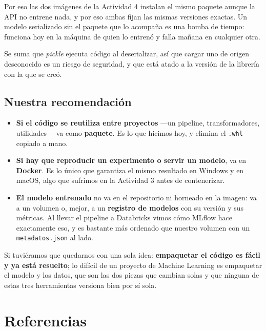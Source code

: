 \documentclass[12pt,a4paper]{article}
\begin{document}
Por eso las dos imágenes de la Actividad 4 instalan el mismo paquete aunque la API no entrene
nada, y por eso ambas fijan las mismas versiones exactas. Un modelo serializado sin el paquete
que lo acompaña es una bomba de tiempo: funciona hoy en la máquina de quien lo entrenó y falla
mañana en cualquier otra.

Se suma que \emph{pickle} ejecuta código al deserializar, así que cargar uno de origen
desconocido es un riesgo de seguridad, y que está atado a la versión de la librería con la que se
creó.

\subsection{Nuestra recomendación}

\begin{itemize}[leftmargin=1.2em]
\item \textbf{Si el código se reutiliza entre proyectos} —un pipeline, transformadores, utilidades—
va como \textbf{paquete}. Es lo que hicimos hoy, y elimina el \texttt{.whl} copiado a mano.
\item \textbf{Si hay que reproducir un experimento o servir un modelo}, va en \textbf{Docker}. Es
lo único que garantiza el mismo resultado en Windows y en macOS, algo que sufrimos en la
Actividad 3 antes de contenerizar.
\item \textbf{El modelo entrenado} no va en el repositorio ni horneado en la imagen: va a un
volumen o, mejor, a un \textbf{registro de modelos} con su versión y sus métricas. Al llevar el
pipeline a Databricks vimos cómo MLflow hace exactamente eso, y es bastante más ordenado que
nuestro volumen con un \texttt{metadatos.json} al lado.
\end{itemize}

Si tuviéramos que quedarnos con una sola idea: \textbf{empaquetar el código es fácil y ya está
resuelto}; lo difícil de un proyecto de Machine Learning es empaquetar el modelo y los datos, que
son las dos piezas que cambian solas y que ninguna de estas tres herramientas versiona bien por
sí sola.

\section{Referencias}
\end{document}
